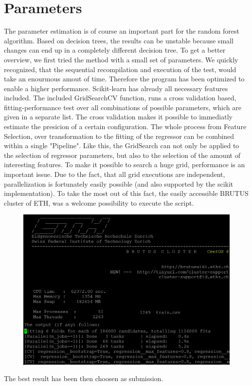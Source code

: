 \documentclass[a4paper, 10pt]{article}
\begin{document}
\section{Parameters}
The parameter estimation is of course an important part for the random forest algorithm. Based on decision trees, the results can be unstable because small changes can end up in a completely different decision tree. To get a better overview, we first tried the method with a small set of parameters. We quickly recognized, that the sequential recompilation and execution of the test, would take an enourmous amout of time. Therefore the program has been optimized to enable a higher performance.
Scikit-learn has already all necessary features included. The included GridSearchCV function, runs a cross validation based, fitting-performance test over all combinations of possible parameters, which are given in a separate list. The cross validation makes it possible to immediatly estimate the presicion of a certain configuration. The whole process from Feature Selection, over transformation to the fitting of the regressor can be combined within a single "Pipeline". Like this, the GridSearch can not only be applied to the selection of regressor parameters, but also to the selection of the amount of interesting features.
To make it possible to search a huge grid, performance is an important issue. Due to the fact, that all grid executions are independent, parallelization is fortunately easily possible (and also supported by the scikit implementation). To take the most out of this fact, the easily accessible BRUTUS cluster of ETH, was a welcome possibility to execute the script.
\begin{figure}	
	\centering
	\includegraphics[scale=0.6]{ScreenshotCluster.png}
\end{figure}
The best result has been then choosen as submission.
\end{document}
